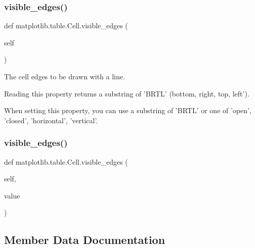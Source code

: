 \mbox{\label{classmatplotlib_1_1table_1_1Cell_a7569d185908e0a803db40089c2c7a99c}} 
\subsubsection{\texorpdfstring{visible\+\_\+edges()}{visible\_edges()}\hspace{0.1cm}{\footnotesize\ttfamily [1/2]}}
{\footnotesize\ttfamily def matplotlib.\+table.\+Cell.\+visible\+\_\+edges (\begin{DoxyParamCaption}\item[{}]{self }\end{DoxyParamCaption})}

\begin{DoxyVerb}The cell edges to be drawn with a line.

Reading this property returns a substring of 'BRTL' (bottom, right,
top, left').

When setting this property, you can use a substring of 'BRTL' or one
of {'open', 'closed', 'horizontal', 'vertical'}.
\end{DoxyVerb}
 \mbox{\label{classmatplotlib_1_1table_1_1Cell_a90354bcde979cddcc4da72a71f68b626}} 
\subsubsection{\texorpdfstring{visible\+\_\+edges()}{visible\_edges()}\hspace{0.1cm}{\footnotesize\ttfamily [2/2]}}
{\footnotesize\ttfamily def matplotlib.\+table.\+Cell.\+visible\+\_\+edges (\begin{DoxyParamCaption}\item[{}]{self,  }\item[{}]{value }\end{DoxyParamCaption})}



\subsection{Member Data Documentation}
\mbox{\label{classmatplotlib_1_1table_1_1Cell_aeb244235d46f60ea85169467a83fca8f}} 
